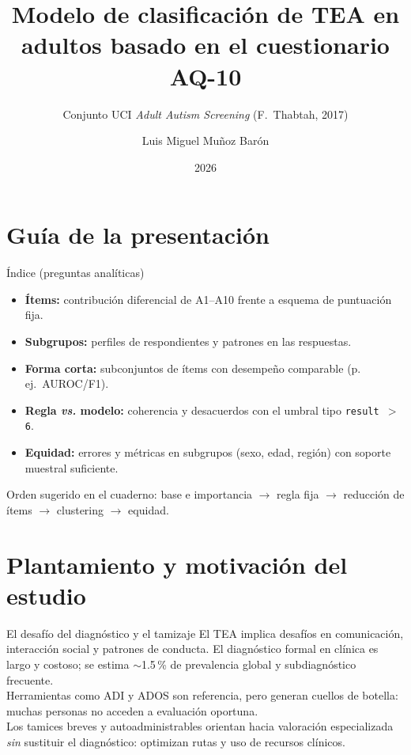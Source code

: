 \documentclass[11pt]{beamer}
\author{Luis Miguel Muñoz Barón}
\title[TEA en adultos / AQ-10]{%
  Modelo de clasificación de TEA en adultos
  basado en el cuestionario AQ-10
}
\subtitle{Conjunto UCI \emph{Adult Autism Screening} (F.~Thabtah, 2017)}
\date{2026}
\institute[]{%
  Diplomado en Inteligencia Artificial Aplicada 2026\\[0.2em]
  IPICYT
}
\begin{document}
\begin{frame}
  \titlepage
\end{frame}

\section{Guía de la presentación}

\begin{frame}{Índice (preguntas analíticas)}
  \begin{itemize}
    \setlength{\itemsep}{0.35em}
    \item \textbf{Ítems:} contribución diferencial de A1--A10 frente a esquema de puntuación fija.
    \item \textbf{Subgrupos:} perfiles de respondientes y patrones en las respuestas.
    \item \textbf{Forma corta:} subconjuntos de ítems con desempeño comparable (p.\,ej.\ AUROC/F1).
    \item \textbf{Regla \emph{vs.} modelo:} coherencia y desacuerdos con el umbral tipo \texttt{result $>$ 6}.
    \item \textbf{Equidad:} errores y métricas en subgrupos (sexo, edad, región) con soporte muestral suficiente.
  \end{itemize}
  \vspace{0.4em}
  {\footnotesize\color{gray} Orden sugerido en el cuaderno: base e importancia $\rightarrow$ regla fija $\rightarrow$ reducción de ítems $\rightarrow$ clustering $\rightarrow$ equidad.}
\end{frame}

\section{Plantamiento y motivación del estudio}

\begin{frame}{El desafío del diagnóstico y el tamizaje}
  El TEA implica desafíos en comunicación, interacción social y patrones de conducta. El diagnóstico formal en clínica es largo y costoso; se estima $\sim$1.5\,\% de prevalencia global y subdiagnóstico frecuente.\\[0.45em]
  Herramientas como ADI y ADOS son referencia, pero generan cuellos de botella: muchas personas no acceden a evaluación oportuna.\\[0.45em]
  Los tamices breves y autoadministrables orientan hacia valoración especializada \emph{sin} sustituir el diagnóstico: optimizan rutas y uso de recursos clínicos.
\end{frame}
\end{document}
